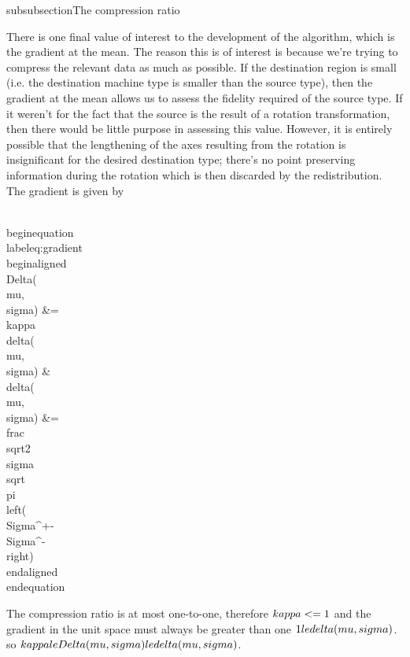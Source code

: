 subsubsection{The compression ratio}

There is one final value of interest to the development of the algorithm, which is the gradient at the mean. The reason this is of interest is because we're trying to compress the relevant data as much as possible. If the destination region is small (i.e. the destination machine type is smaller than the source type), then the gradient at the mean allows us to assess the fidelity required of the source type. If it weren't for the fact that the source is the result of a rotation transformation, then there would be little purpose in assessing this value. However, it is entirely possible that the lengthening of the axes resulting from the rotation is insignificant for the desired destination type; there's no point preserving information during the rotation which is then discarded by the redistribution. The gradient is given by

\\begin{equation}\\label{eq:gradient}
\\begin{aligned}
\\Delta(\\mu,\\sigma) &= \\kappa  \\delta(\\mu,\\sigma)  & \\delta(\\mu,\\sigma)  &= \\frac{ \\sqrt{2} }{ \\sigma \\sqrt{\\pi }  \\left(\\Sigma^+-\\Sigma^-\\right)}
\\end{aligned}
\\end{equation}

The compression ratio is at most one-to-one, therefore $\\kappa <=1$ and the gradient in the unit space must always be greater than one $1 \\le \\delta(\\mu,\\sigma)$. so $ \\kappa \\le \\Delta(\\mu,\\sigma) \\le \\delta(\\mu,\\sigma)$.

